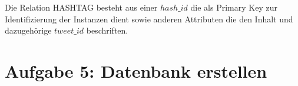 \documentclass[12pt]{article}
\begin{document}
Die Relation HASHTAG besteht aus einer $hash\_id$ die als Primary Key zur Identifizierung der Instanzen dient sowie anderen Attributen die den Inhalt und dazugehörige $tweet\_id$ beschriften.

\section*{Aufgabe 5: Datenbank erstellen}


\end{document}
